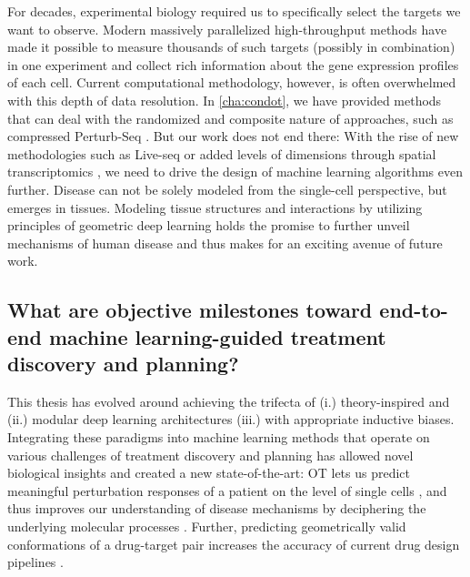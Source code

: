 For decades, experimental biology required us to specifically select the targets we want to observe. Modern massively parallelized high-throughput methods have made it possible to measure thousands of such targets (possibly in combination) in one experiment and collect rich information about the gene expression profiles of each cell.
Current computational methodology, however, is often overwhelmed with this depth of data resolution.
In \cref{cha:condot}, we have provided methods that can deal with the randomized and composite nature of approaches, such as compressed Perturb-Seq \citep{dixit2016perturb, cleary2017efficient, cleary2020necessity, roohani2022gears}.
But our work does not end there: With the rise of new methodologies such as Live-seq \citep[\cref{sec:sbalign}]{chen2022live} or added levels of dimensions through spatial transcriptomics \citep{marx2021method}, we need to drive the design of machine learning algorithms even further. Disease can not be solely modeled from the single-cell perspective, but emerges in tissues. Modeling tissue structures and interactions by utilizing principles of geometric deep learning \citep{fischer2023modeling} holds the promise to further unveil mechanisms of human disease and thus makes for an exciting avenue of future work.


\subsection*{\textbf{What are objective milestones toward end-to-end machine learning-guided treatment discovery and planning?}}

This thesis has evolved around achieving the trifecta of (i.) theory-inspired and (ii.) modular deep learning architectures (iii.) with appropriate inductive biases. Integrating these paradigms into machine learning methods that operate on various challenges of treatment discovery and planning has allowed novel biological insights and created a new state-of-the-art: OT lets us predict meaningful perturbation responses of a patient on the level of single cells \citep{bunne2021learning, bunne2022supervised}, and thus improves our understanding of disease mechanisms by deciphering the underlying molecular processes \citep{bunne2022proximal, bunne2022recovering}. Further, predicting geometrically valid conformations of a drug-target pair increases the accuracy of current drug design pipelines \citep{somnath2021multi, ganea2022independent, somnath2023aligned}. \\

